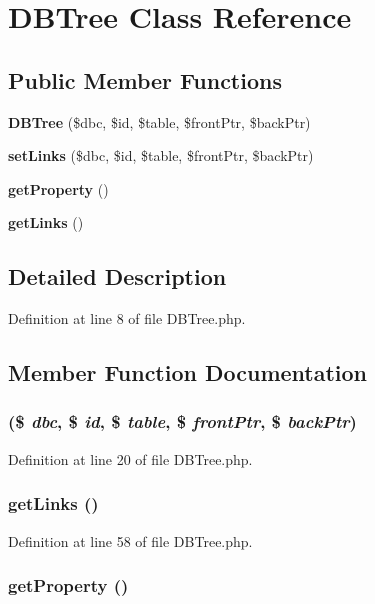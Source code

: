 \section{DBTree Class Reference}
\label{class_d_b_tree}
\subsection*{Public Member Functions}
\begin{DoxyCompactItemize}
\item 
{\bf DBTree} (\$dbc, \$id, \$table, \$frontPtr, \$backPtr)
\item 
{\bf setLinks} (\$dbc, \$id, \$table, \$frontPtr, \$backPtr)
\item 
{\bf getProperty} ()
\item 
{\bf getLinks} ()
\end{DoxyCompactItemize}


\subsection{Detailed Description}


Definition at line 8 of file DBTree.php.

\subsection{Member Function Documentation}
\subsubsection[{DBTree}]{ (\$ {\em dbc}, \/  \$ {\em id}, \/  \$ {\em table}, \/  \$ {\em frontPtr}, \/  \$ {\em backPtr})}\label{class_d_b_tree_a51d1dd5e895a35a8a0b073ce793777e5}


Definition at line 20 of file DBTree.php.
\subsubsection[{getLinks}]{\setlength{\rightskip}{0pt plus 5cm}getLinks ()}\label{class_d_b_tree_a09967788c0b5ec97029e46a2d1980d08}


Definition at line 58 of file DBTree.php.
\subsubsection[{getProperty}]{\setlength{\rightskip}{0pt plus 5cm}getProperty ()}\label{class_d_b_tree_ab1652be336eddac3696d7c697bd8a7d7}


